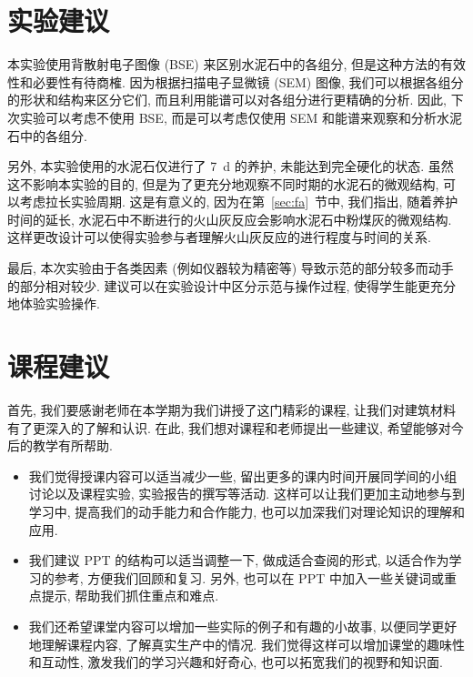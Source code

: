 
\section{实验建议}

本实验使用背散射电子图像 (BSE) 来区别水泥石中的各组分, 但是这种方法的有效性和必要性有待商榷.
因为根据扫描电子显微镜 (SEM) 图像, 我们可以根据各组分的形状和结构来区分它们, 而且利用能谱可以对各组分进行更精确的分析.
因此, 下次实验可以考虑不使用 BSE, 而是可以考虑仅使用 SEM 和能谱来观察和分析水泥石中的各组分.

另外, 本实验使用的水泥石仅进行了 \SI{7}{\day} 的养护, 未能达到完全硬化的状态.
虽然这不影响本实验的目的, 但是为了更充分地观察不同时期的水泥石的微观结构, 可以考虑拉长实验周期. 这是有意义的, 因为在第~\ref{sec:fa}~节中, 我们指出, 随着养护时间的延长, 水泥石中不断进行的火山灰反应会影响水泥石中粉煤灰的微观结构. 这样更改设计可以使得实验参与者理解火山灰反应的进行程度与时间的关系.

最后, 本次实验由于各类因素 (例如仪器较为精密等) 导致示范的部分较多而动手的部分相对较少.
建议可以在实验设计中区分示范与操作过程, 使得学生能更充分地体验实验操作.

\section{课程建议}


首先, 我们要感谢老师在本学期为我们讲授了这门精彩的课程, 让我们对建筑材料有了更深入的了解和认识.
在此, 我们想对课程和老师提出一些建议, 希望能够对今后的教学有所帮助.

\begin{itemize}
  \item 我们觉得授课内容可以适当减少一些, 留出更多的课内时间开展同学间的小组讨论以及课程实验, 实验报告的撰写等活动.
        这样可以让我们更加主动地参与到学习中, 提高我们的动手能力和合作能力, 也可以加深我们对理论知识的理解和应用.
  \item 我们建议 PPT 的结构可以适当调整一下, 做成适合查阅的形式, 以适合作为学习的参考, 方便我们回顾和复习.
        另外, 也可以在 PPT 中加入一些关键词或重点提示, 帮助我们抓住重点和难点.
  \item 我们还希望课堂内容可以增加一些实际的例子和有趣的小故事, 以便同学更好地理解课程内容, 了解真实生产中的情况.
        我们觉得这样可以增加课堂的趣味性和互动性, 激发我们的学习兴趣和好奇心, 也可以拓宽我们的视野和知识面.
\end{itemize}

